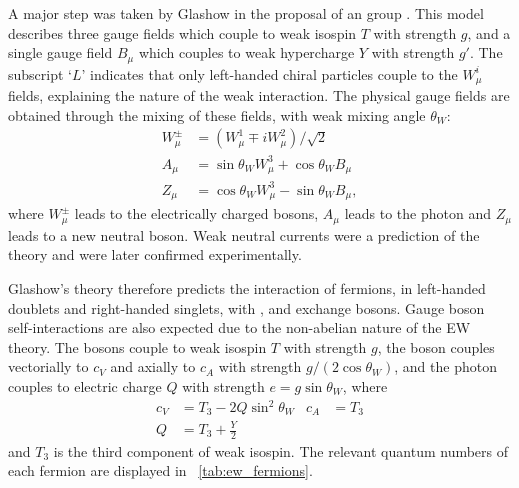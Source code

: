 A major step was taken by Glashow in the proposal of an \EWgroup group 
\cite{Glashow:1961}. This model describes three gauge fields 
 which couple to weak isospin $T$ with 
strength $g$, and a single gauge field $B_{\mu}$ which couples to weak hypercharge $Y$ 
with strength $g'$. The subscript `$L$' indicates that only left-handed chiral particles 
couple to the $W^i_{\mu}$ fields, explaining the \VminusA nature of the weak interaction. 
The physical gauge fields are obtained through the mixing of these fields, with weak mixing
angle $\theta_W$:
\begin{align}
	W^{\pm}_{\mu} &= (W^1_{\mu} \mp i W^2_{\mu}) / \sqrt{2} \\
	A_{\mu} &= \sin\theta_W W^3_{\mu} + \cos\theta_W B_{\mu} \\
	Z_{\mu} &= \cos\theta_W W^3_{\mu} - \sin\theta_W B_{\mu} ,
\end{align}
where $W^{\pm}_{\mu}$ leads to the electrically charged \PWpm bosons, $A_{\mu}$ leads to
the photon and $Z_{\mu}$ leads to a new neutral \PZ boson. Weak neutral currents were a 
prediction of the theory and were later confirmed experimentally. 

Glashow's \EWgroup theory therefore predicts the interaction of fermions, in left-handed 
 doublets and right-handed  singlets, with \PWpm, \PZ and \Pphoton 
exchange bosons. Gauge boson self-interactions are also expected due to the non-abelian 
nature of the \ac{EW} theory. The \PWpm bosons couple to weak isospin $T$ with strength 
$g$, the \PZ boson couples vectorially to $c_V$ and axially to $c_A$ with strength 
$g/(2\cos\theta_W)$, and the photon couples to electric charge $Q$ with strength 
$e = g\sin\theta_W$, where
\begin{align}
	c_V &= T_3 - 2 Q \sin^2\theta_W & c_A &= T_3 \\
	Q   &= T_3 + \frac{Y}{2}
\end{align}
and $T_3$ is the third component of weak isospin. The relevant quantum numbers of each
fermion are displayed in \Table~\ref{tab:ew_fermions}.

